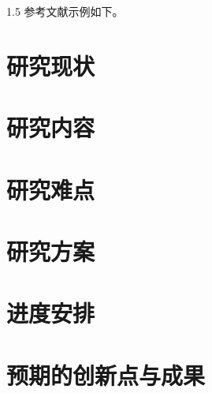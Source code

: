 \documentclass[a4paper,12pt]{NPUResearchProposal}
\newcommand{\linespacing}{1.5}
\begin{document}
\begin{spacing}{\linespacing}
参考文献示例如下\citep{rudin1964principles}。
\section{研究现状}
\label{sec:current_state}
\section{研究内容}
\label{sec:contents_research}
\section{研究难点}
\label{sec:keypoints}
\section{研究方案}
\label{sec:roadmap}
\section{进度安排}
\section{预期的创新点与成果}
\end{spacing}

\end{document}

